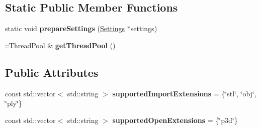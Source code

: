 \subsection*{Static Public Member Functions}
\begin{DoxyCompactItemize}
\item 
\mbox{\label{classpepr3d_1_1_main_application_a2cdfe5b197e302f0097e62cb7ba7c47c}} 
static void {\bfseries prepare\+Settings} (\mbox{\hyperlink{classpepr3d_1_1_settings}{Settings}} $\ast$settings)
\item 
\mbox{\label{classpepr3d_1_1_main_application_a09c365abb40896d8d680b311b352c726}} 
\+::Thread\+Pool \& {\bfseries get\+Thread\+Pool} ()
\end{DoxyCompactItemize}
\subsection*{Public Attributes}
\begin{DoxyCompactItemize}
\item 
\mbox{\label{classpepr3d_1_1_main_application_a33cbcb0bc0f82a9c5e999896790327da}} 
const std\+::vector$<$ std\+::string $>$ {\bfseries supported\+Import\+Extensions} = \{\char`\"{}stl\char`\"{}, \char`\"{}obj\char`\"{}, \char`\"{}ply\char`\"{}\}
\item 
\mbox{\label{classpepr3d_1_1_main_application_a6dc274ba0f11ff91cef2cebb39dad823}} 
const std\+::vector$<$ std\+::string $>$ {\bfseries supported\+Open\+Extensions} = \{\char`\"{}p3d\char`\"{}\}
\end{DoxyCompactItemize}
